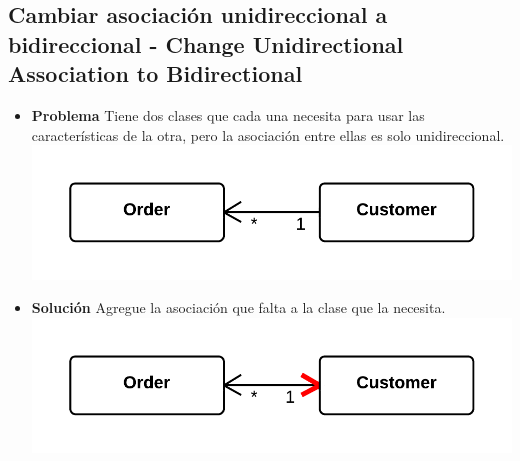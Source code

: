 \documentclass[11pt,a4paper,oneside]{book}
\begin{document}
\subsection{Cambiar asociación unidireccional a bidireccional - Change Unidirectional Association to Bidirectional}
\label{changeunidirectionalassociationtobidirectional}
\begin{itemize}
    \item \textbf{Problema} Tiene dos clases que cada una necesita para usar las características de la otra, pero la asociación entre ellas es solo unidireccional.\\
    \centering \includegraphics[scale=0.2]{changeunidirectionalassociationtobidirectionalproblem}
    \item \textbf{Solución} Agregue la asociación que falta a la clase que la necesita.\\
    \centering \includegraphics[scale=0.2]{changeunidirectionalassociationtobidirectionalsolution}
\end{itemize}
    
\end{document}
